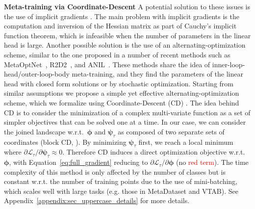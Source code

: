 \documentclass{article}
\begin{document}
\textbf{Meta-training via Coordinate-Descent}
A potential solution to these issues is the use of implicit gradients \citep{chen2020modular, rajeswaran2019meta, chen2022meta}. The main problem with implicit gradients is the computation and inversion of the Hessian matrix as part of Cauchy’s implicit function theorem, which is infeasible when the number of parameters in the linear head is large. Another possible solution is the use of an alternating-optimization scheme, similar to the one proposed in a number of recent methods such as MetaOptNet~\citep{lee2019meta}, R2D2~\citep{bertinetto2018meta}, and ANIL~\citep{raghu2019rapid}. These methods share the idea of inner-loop-head/outer-loop-body meta-training, 
and they find the parameters of the linear head with closed form solutions or by stochastic optimization.
Starting from similar assumptions we propose a simple yet effective alternating-optimization scheme, which we formalize using Coordinate-Descent (CD) \citep{wright2015coordinate}. The idea behind CD is to consider the minimization of a complex multi-variate function as a set of simpler objectives that can be solved one at a time. In our case, we can consider the joined landscape w.r.t.~$\boldsymbol{\phi}$ and $\boldsymbol{\psi}_\tau$ as composed of two separate sets of coordinates (block CD, \citealt{wright2015coordinate}).
By minimizing $\boldsymbol{\psi}_\tau$ first, we reach a local minimum where $\partial \mathcal{L}_{\tau} / \partial \boldsymbol{\psi}_{\tau} \approx 0$. Therefore CD induces a direct optimization objective w.r.t.~$\boldsymbol{\phi}$, with Equation~\eqref{eq:full_gradient} reducing to $\partial \mathcal{L}_{\tau} / \partial \boldsymbol{\phi}$ (no \textcolor{red}{red term}).
The time complexity of this method is only affected by the number of classes but is constant w.r.t. the number of training points due to the use of mini-batching, which scales well with large tasks (e.g. those in MetaDataset and VTAB). See Appendix~\ref{appendix:sec_uppercase_details} for more details.
\end{document}
